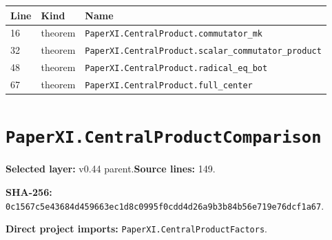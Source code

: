 \documentclass[10pt,oneside]{book}
\begin{document}
\begin{longtable}{@{}p{}p{}p{}@{}}\toprule Line&Kind&Name\\\midrule\endhead

16&theorem&\nolinkurl{PaperXI.CentralProduct.commutator_mk}\\

32&theorem&\nolinkurl{PaperXI.CentralProduct.scalar_commutator_product}\\

48&theorem&\nolinkurl{PaperXI.CentralProduct.radical_eq_bot}\\

67&theorem&\nolinkurl{PaperXI.CentralProduct.full_center}\\

\bottomrule\end{longtable}

\section{\texorpdfstring{\nolinkurl{PaperXI.CentralProductComparison}}{PaperXI.CentralProductComparison}}\label{module:PaperXI.CentralProductComparison}

\textbf{Selected layer:} v0.44 parent.\quad\textbf{Source lines:} 149.\par\textbf{SHA-256:} {\scriptsize\nolinkurl{0c1567c5e43684d459663ec1d8c0995f0cdd4d26a9b3b84b56e719e76dcf1a67}}.


\textbf{Direct project imports:} \nolinkurl{PaperXI.CentralProductFactors}.
\end{document}
